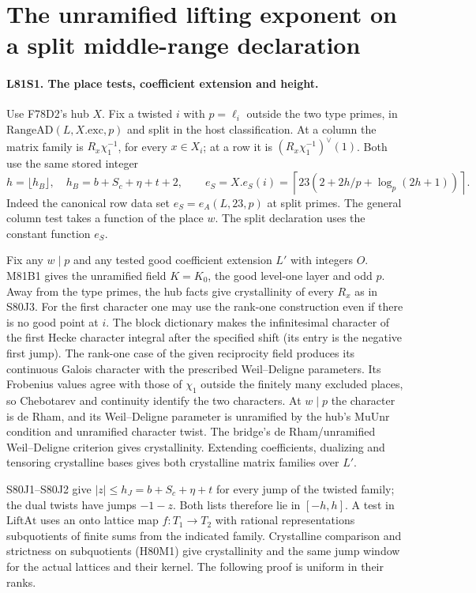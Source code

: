 \section{The unramified lifting exponent on a split middle-range declaration}

\paragraph{L81S1. The place tests, coefficient extension and height.}
Use F78D2's hub $X$. Fix a twisted $i$ with $p=\ell_i$ outside the two
type primes, in $\mathrm{RangeAD}(L,X.\mathrm{exc},p)$ and split in the
host classification. At a column the matrix family is
$R_x\chi_1^{-1}$, for every $x\in X_i$; at a row it is
$(R_x\chi_1^{-1})^\vee(1)$. Both use the same stored integer
\[
 h=\lfloor h_B\rfloor,\quad h_B=b+S_c+\eta+t+2,\qquad
 e_S=X.e_S(i)=\left\lceil23\left(2+2h/p+
                         \log_p(2h+1)\right)\right\rceil .
\]
Indeed the canonical row data set $e_S=e_A(L,23,p)$ at split
primes. The general column test takes a function of the place
$w$. The split declaration uses the constant function $e_S$.

Fix any $w\mid p$ and any tested good coefficient extension $L'$
with integers $O$. M81B1 gives the unramified field $K=K_0$,
the good level-one layer and odd $p$. Away from the type primes,
the hub facts give crystallinity of every $R_x$ as in S80J3.
For the first character one may use the rank-one construction
even if there is no good point at $i$. The block dictionary makes
the infinitesimal character of the first Hecke character integral
after the specified shift (its entry is the negative first jump).
The rank-one case of the given reciprocity field produces its
continuous Galois character with the prescribed Weil--Deligne
parameters. Its Frobenius values agree with those of $\chi_1$
outside the finitely many excluded places, so Chebotarev and
continuity identify the two characters. At $w\mid p$ the character
is de Rham, and its Weil--Deligne parameter is unramified by the
hub's $\mathrm{MuUnr}$ condition and unramified character twist.
The bridge's de Rham/unramified Weil--Deligne criterion gives
crystallinity. Extending coefficients, dualizing and tensoring
crystalline bases gives both crystalline matrix families over $L'$.

S80J1--S80J2 give $|z|\le h_J=b+S_c+\eta+t$ for every jump
of the twisted family; the dual twists have jumps $-1-z$.
Both lists therefore lie in $[-h,h]$. A test in $\mathrm{LiftAt}$
uses an onto lattice map $f:T_1\to T_2$ with rational representations
subquotients of finite sums from the indicated family. Crystalline
comparison and strictness on subquotients (H80M1) give
crystallinity and the same jump window for the actual lattices
and their kernel. The following proof is uniform in their ranks.

